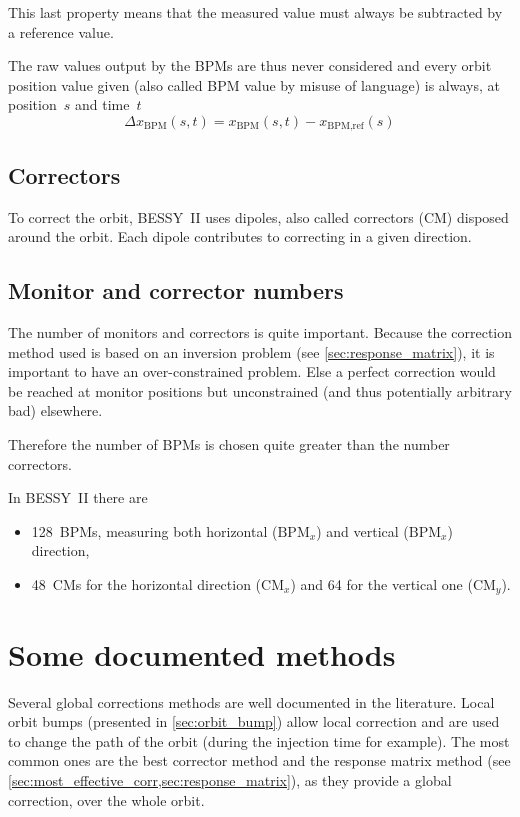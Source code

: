 This last property means that the measured value must always be subtracted by a reference value.

The raw values output by the BPMs are thus never considered and every orbit position value given (also called BPM value by misuse of language) is always, at position~$s$ and time~$t$
\begin{equation}
\Delta x_\text{BPM}(s,t) = x_\text{BPM}(s,t) - x_\text{BPM,ref}(s)
\end{equation}

\subsection{Correctors}
To correct the orbit, BESSY~II uses dipoles, also called correctors (CM) disposed around the orbit. Each dipole contributes to correcting in a given direction. 

\subsection{Monitor and corrector numbers}
The number of monitors and correctors is quite important. Because the correction method used is based on an inversion problem (see \cref{sec:response_matrix}), it is important to have an over-constrained problem. Else a perfect correction would be reached at monitor positions but unconstrained (and thus potentially arbitrary bad) elsewhere.

Therefore the number of BPMs is chosen quite greater than the number correctors.

In BESSY~II there are 
\begin{itemize}
	\item 128~BPMs, measuring both horizontal ($\text{BPM}_x$) and vertical ($\text{BPM}_x$) direction,
	\item 48~CMs for the horizontal direction ($\text{CM}_x$) and 64 for the vertical one ($\text{CM}_y$).
\end{itemize}

\section{Some documented methods}
Several global corrections methods are well documented in the literature. Local orbit bumps (presented in \cref{sec:orbit_bump}) allow local correction and are used to change the path of the orbit (during the injection time for example). The most common ones are the best corrector method and the response matrix method (see \cref{sec:most_effective_corr,sec:response_matrix}), as they provide a global correction, over the whole orbit. 

